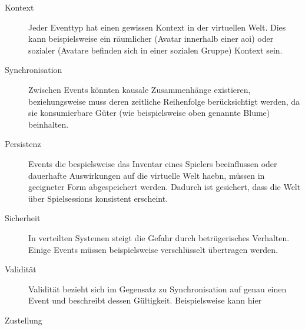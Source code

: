 \begin{description}
\item[Kontext] Jeder Eventtyp hat einen gewissen Kontext in der virtuellen Welt. Dies kann beispielsweise ein räumlicher (Avatar innerhalb einer \ac{aoi}) oder sozialer (Avatare befinden sich in einer sozialen Gruppe) Kontext sein.

\item[Synchronisation] Zwischen Events könnten kausale Zusammenhänge existieren, beziehungsweise muss deren zeitliche Reihenfolge berücksichtigt werden, da sie konsumierbare Güter (wie beispielsweise oben genannte Blume) beinhalten.

\item[Persistenz] Events die bespielsweise das Inventar eines Spielers beeinflussen oder dauerhafte Auswirkungen auf die virtuelle Welt haebn, müssen in geeigneter Form abgespeichert werden. Dadurch ist gesichert, dass die Welt über Spielsessions konsistent erscheint.

\item[Sicherheit] In verteilten Systemen steigt die Gefahr durch betrügerisches Verhalten. Einige Events müssen beispielsweise verschlüsselt übertragen werden.

\item[Validität] Validität bezieht sich im Gegensatz zu Synchronisation auf genau einen Event und beschreibt dessen Gültigkeit. Beispielsweise kann hier 

\item[Zustellung]
\end{description}
